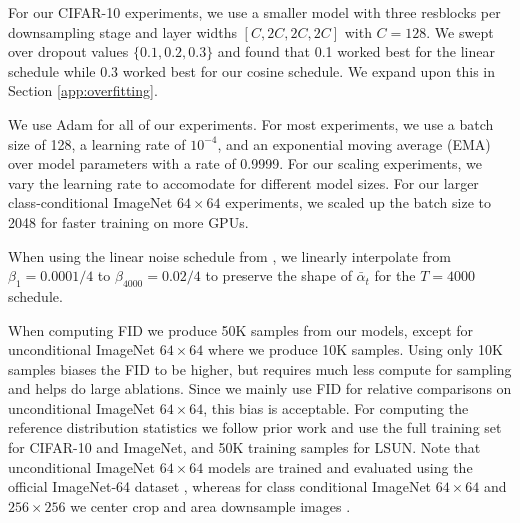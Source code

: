 \documentclass{article}
\begin{document}
For our CIFAR-10 experiments, we use a smaller model with three resblocks per downsampling stage and layer widths $[C, 2C, 2C, 2C]$ with $C=128$. We swept over dropout values $\{0.1, 0.2, 0.3\}$ and found that 0.1 worked best for the linear schedule while 0.3 worked best for our cosine schedule. We expand upon this in Section \ref{app:overfitting}.

We use Adam \citep{adam} for all of our experiments. For most experiments, we use a batch size of 128, a learning rate of $10^{-4}$, and an exponential moving average (EMA) over model parameters with a rate of 0.9999. For our scaling experiments, we vary the learning rate to accomodate for different model sizes. For our larger class-conditional ImageNet $64 \times 64$ experiments, we scaled up the batch size to 2048 for faster training on more GPUs.

When using the linear noise schedule from \citet{ddpm}, we linearly interpolate from $\beta_1=0.0001/4$ to $\beta_{4000}=0.02/4$ to preserve the shape of $\bar{\alpha}_t$ for the $T=4000$ schedule.

When computing FID we produce 50K samples from our models, except for unconditional ImageNet $64 \times 64$ where we produce 10K samples. Using only 10K samples biases the FID to be higher, but requires much less compute for sampling and helps do large ablations. Since we mainly use FID for relative comparisons on unconditional ImageNet $64 \times 64$, this bias is acceptable. For computing the reference distribution statistics we follow prior work \citep{ddpm,biggan} and use the full training set for CIFAR-10 and ImageNet, and 50K training samples for LSUN. Note that unconditional ImageNet $64 \times 64$ models are trained and evaluated using the official ImageNet-64 dataset \cite{pixelrnn}, whereas for class conditional ImageNet $64 \times 64$ and $256 \times 256$ we center crop and area downsample images \cite{biggan}.

\end{document}
